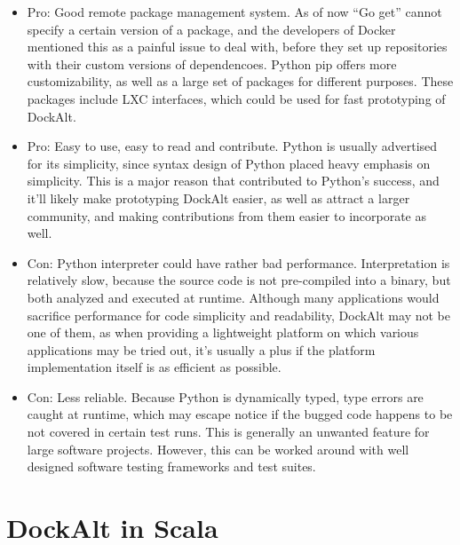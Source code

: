 \documentclass[letterpaper,twocolumn,10pt]{article}
\begin{document}
\begin{itemize}
\item Pro: Good remote package management system. As of now ``Go get'' cannot specify a certain version of a package, and the developers of Docker mentioned this as a painful issue to deal with, before they set up repositories with their custom versions of dependencoes. Python pip offers more customizability, as well as a large set of packages for different purposes. These packages include LXC interfaces, which could be used for fast prototyping of DockAlt.
\item Pro: Easy to use, easy to read and contribute. Python is usually advertised for its simplicity, since syntax design of Python placed heavy emphasis on simplicity. This is a major reason that contributed to Python's success, and it'll likely make prototyping DockAlt easier, as well as attract a larger community, and making contributions from them easier to incorporate as well.
\item Con: Python interpreter could have rather bad performance. Interpretation is relatively slow, because the source code is not pre-compiled into a binary, but both analyzed and executed at runtime. Although many applications would sacrifice performance for code simplicity and readability, DockAlt may not be one of them, as when providing a lightweight platform on which various applications may be tried out, it's usually a plus if the platform implementation itself is as efficient as possible.
\item Con: Less reliable. Because Python is dynamically typed, type errors are caught at runtime, which may escape notice if the bugged code happens to be not covered in certain test runs. This is generally an unwanted feature for large software projects. However, this can be worked around with well designed software testing frameworks and test suites.
\end{itemize}

\section{DockAlt in Scala}
\end{document}
